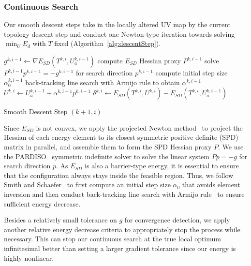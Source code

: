 \subsubsection{Continuous Search}
\label{sec:descentStep}

Our smooth descent steps take in the locally altered UV map by the current topology descent step and conduct one Newton-type iteration towards solving $\min_U E_d$ with $T$ fixed (Algorithm~\ref{alg:descentStep}).

\begin{algorithm}[h]
\SetAlgoLined
{}
$g^{k,i-1} \leftarrow \nabla E_{SD}(T^{k,i}, U_a^{k,i-1})$\;
compute $E_{SD}$ Hessian proxy $P^{k,i-1}$\;
solve $P^{k,i-1} p^{k,i-1} = -g^{k,i-1}$ for search direction $p^{k,i-1}$\;
compute initial step size $\alpha^{k,i-1}_0$\;
back-tracking line search with Armijo rule to obtain $\alpha^{k,i-1}$\;
$U^{k,i} \leftarrow U_a^{k,i-1} + \alpha^{k,i-1} p^{k,i-1}$\;
$\delta^{k,i} \leftarrow E_{SD}(T^{k,i}, U^{k,i}) - E_{SD}(T^{k,i}, U_a^{k,i-1})$\;
\caption{Smooth Descent Step $(k+1,i)$}
\label{alg:descentStep}
\end{algorithm}
Since $E_{SD}$ is not convex, we apply the projected Newton method~\cite{Teran2005Robust} to project the Hessian of each energy element to its closest symmetric positive definite (SPD) matrix in parallel, and assemble them to form the SPD Hessian proxy $P$. We use the PARDISO~\cite{pardiso-6.0a, pardiso-6.0b} symmetric indefinite solver to solve the linear system $P p = -g$ for search direction $p$.  As $E_{SD}$ is also a barrier-type energy, it is essential to ensure that the configuration always stays inside the feasible region. Thus, we follow Smith and Schaefer~ to first compute an initial step size $\alpha_0$ that avoids element inversion and then conduct back-tracking line search with Armijo rule~\cite{Armijo1966Minimization} to ensure sufficient energy decrease.

Besides a relatively small tolerance on $g$ for convergence detection, we apply another relative energy decrease criteria to appropriately stop the process while necessary.
This can stop our continuous search at the true local optimum infinitesimal better than setting a larger gradient tolerance since our energy is highly nonlinear.

